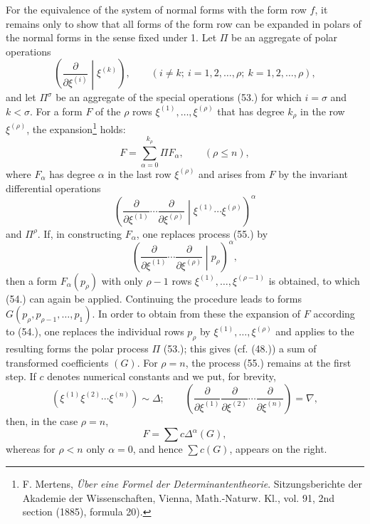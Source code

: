 \documentclass[11pt]{article}
\begin{document}
For the equivalence of the system of normal forms with the form row $f$, it remains only to show that all forms of the form row can be expanded in polars of the normal forms in the sense fixed under 1. Let $\Pi$ be an aggregate of polar operations
\begin{equation}
 \left(\frac{\partial}{\partial\xi^{(i)}}\middle|\xi^{(k)}\right),
 \qquad (i\ne k;\ i=1,2,\ldots,\rho;\ k=1,2,\ldots,\rho),
\tag{53}
\end{equation}
and let $\Pi^\sigma$ be an aggregate of the special operations (53.) for which $i=\sigma$ and $k<\sigma$. For a form $F$ of the $\rho$ rows $\xi^{(1)},\ldots,\xi^{(\rho)}$ that has degree $k_\rho$ in the row $\xi^{(\rho)}$, the expansion\footnote{F. Mertens, \emph{\"Uber eine Formel der Determinantentheorie}. Sitzungsberichte der Akademie der Wissenschaften, Vienna, Math.-Naturw. Kl., vol. 91, 2nd section (1885), formula 20).} holds:
\begin{equation}
 F=\sum_{\alpha=0}^{k_\rho}\Pi F_\alpha,
 \qquad(\rho\le n),
\tag{54}
\end{equation}
where $F_\alpha$ has degree $\alpha$ in the last row $\xi^{(\rho)}$ and arises from $F$ by the invariant differential operations
\begin{equation}
 \left(\frac{\partial}{\partial\xi^{(1)}}\cdots\frac{\partial}{\partial\xi^{(\rho)}}\middle|\xi^{(1)}\cdots\xi^{(\rho)}\right)^\alpha
\tag{55}
\end{equation}
and $\Pi^\rho$. If, in constructing $F_\alpha$, one replaces process (55.) by
\begin{equation}
 \left(\frac{\partial}{\partial\xi^{(1)}}\cdots\frac{\partial}{\partial\xi^{(\rho)}}\middle|p_\rho\right)^\alpha,
\tag{56}
\end{equation}
then a form $F_\alpha(p_\rho)$ with only $\rho-1$ rows $\xi^{(1)},\ldots,\xi^{(\rho-1)}$ is obtained, to which (54.) can again be applied. Continuing the procedure leads to forms $G(p_\rho,p_{\rho-1},\ldots,p_1)$. In order to obtain from these the expansion of $F$ according to (54.), one replaces the individual rows $p_\rho$ by $\xi^{(1)},\ldots,\xi^{(\rho)}$ and applies to the resulting forms the polar process $\Pi$ (53.); this gives (cf. (48.)) a sum of transformed coefficients $(G)$. For $\rho=n$, the process (55.) remains at the first step. If $c$ denotes numerical constants and we put, for brevity,
\begin{equation}
 (\xi^{(1)}\xi^{(2)}\cdots\xi^{(n)})\sim\Delta;
 \qquad
 \left(\frac{\partial}{\partial\xi^{(1)}}\frac{\partial}{\partial\xi^{(2)}}\cdots\frac{\partial}{\partial\xi^{(n)}}\right)=\nabla,
\tag{57}
\end{equation}
then, in the case $\rho=n$,
\begin{equation}
 F=\sum c\Delta^\alpha(G),
\tag{58}
\end{equation}
whereas for $\rho<n$ only $\alpha=0$, and hence $\sum c(G)$, appears on the right.
\end{document}
